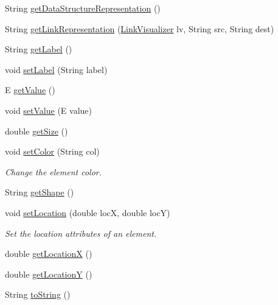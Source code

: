 \begin{DoxyCompactItemize}
\item 
String \hyperlink{classbridges_1_1base_1_1_element_ab5e21b5941c018501db2ab41a6fb3823}{get\+Data\+Structure\+Representation} ()
\item 
String \hyperlink{classbridges_1_1base_1_1_element_ae32deb37d1ad95d2fdfaa616062f319d}{get\+Link\+Representation} (\hyperlink{classbridges_1_1base_1_1_link_visualizer}{Link\+Visualizer} lv, String src, String dest)
\item 
String \hyperlink{classbridges_1_1base_1_1_element_a5c831a0238de487765f6021a887f1542}{get\+Label} ()
\item 
void \hyperlink{classbridges_1_1base_1_1_element_a942ccd766aeca0c4fdbe27ef8cbe78d9}{set\+Label} (String label)
\item 
E \hyperlink{classbridges_1_1base_1_1_element_a44ddc61db34b6cf0bab7dfba667d54af}{get\+Value} ()
\item 
void \hyperlink{classbridges_1_1base_1_1_element_ab3cf1241da0bc4c59cea9d6f0fd7aaf4}{set\+Value} (E value)
\item 
double \hyperlink{classbridges_1_1base_1_1_element_add4b836e041e45e0c7a80eb7fd5a229d}{get\+Size} ()
\item 
void \hyperlink{classbridges_1_1base_1_1_element_a336f2ff70a0873fde6f0b8a43b670ffc}{set\+Color} (String col)
\begin{DoxyCompactList}\small\item\em Change the element color. \end{DoxyCompactList}\item 
String \hyperlink{classbridges_1_1base_1_1_element_aa0fe02d2f5491cf21cc6741f592536a8}{get\+Shape} ()
\item 
void \hyperlink{classbridges_1_1base_1_1_element_a0fe9a52d06e8f3ccc8521e155ec72a27}{set\+Location} (double locX, double locY)
\begin{DoxyCompactList}\small\item\em Set the location attributes of an element. \end{DoxyCompactList}\item 
double \hyperlink{classbridges_1_1base_1_1_element_a57cc1611e0d9cbec9da30d1cdcd3b23d}{get\+LocationX} ()
\item 
double \hyperlink{classbridges_1_1base_1_1_element_a3cfd6af5ca4cae0596845f62018ce004}{get\+LocationY} ()
\item 
String \hyperlink{classbridges_1_1base_1_1_element_a7dc685e317fd9dc2e73e049a9f907e42}{to\+String} ()
\end{DoxyCompactItemize}
